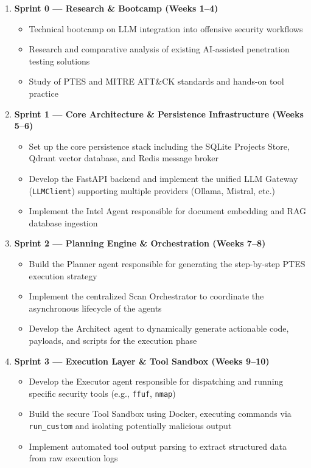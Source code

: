 \documentclass[12pt,a4paper]{report}
\begin{document}
\begin{enumerate}
    \item \textbf{Sprint 0 --- Research \& Bootcamp (Weeks 1--4)}
\begin{itemize}
    \item Technical bootcamp on LLM integration into offensive security workflows
    \item Research and comparative analysis of existing AI-assisted penetration
    testing solutions
    \item Study of PTES and MITRE ATT\&CK standards and hands-on tool practice
\end{itemize}

    \item \textbf{Sprint 1 --- Core Architecture \& Persistence Infrastructure (Weeks 5--6)}
    \begin{itemize}
        \item Set up the core persistence stack including the SQLite Projects Store,
        Qdrant vector database, and Redis message broker
        \item Develop the FastAPI backend and implement the unified LLM Gateway
        (\texttt{LLMClient}) supporting multiple providers (Ollama, Mistral, etc.)
        \item Implement the Intel Agent responsible for document embedding and RAG
        database ingestion
    \end{itemize}

    \item \textbf{Sprint 2 --- Planning Engine \& Orchestration (Weeks 7--8)}
    \begin{itemize}
        \item Build the Planner agent responsible for generating the step-by-step
        PTES execution strategy
        \item Implement the centralized Scan Orchestrator to coordinate the
        asynchronous lifecycle of the agents
        \item Develop the Architect agent to dynamically generate actionable code,
        payloads, and scripts for the execution phase
    \end{itemize}

    \item \textbf{Sprint 3 --- Execution Layer \& Tool Sandbox (Weeks 9--10)}
    \begin{itemize}
        \item Develop the Executor agent responsible for dispatching and running
        specific security tools (e.g., \texttt{ffuf}, \texttt{nmap})
        \item Build the secure Tool Sandbox using Docker, executing commands via
        \texttt{run\_custom} and isolating potentially malicious output
        \item Implement automated tool output parsing to extract structured data
        from raw execution logs
    \end{itemize}


\end{enumerate}
\end{document}
